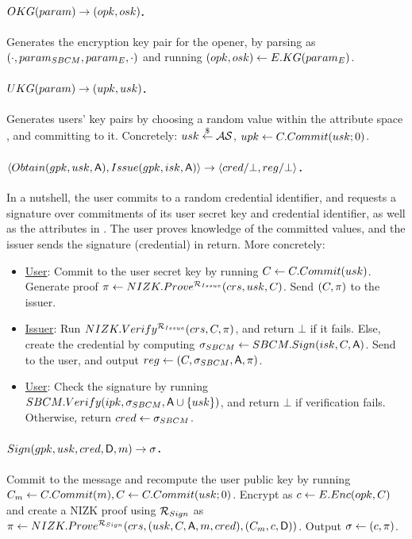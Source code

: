 \paragraph{$OKG(param) \rightarrow (opk,osk)$.} %
Generates the encryption key pair for the opener, by parsing \parm as
$(\cdot,param_{SBCM},param_{E},\cdot)$ and running $(opk,osk) \gets
E.KG(param_{E})$.

\paragraph{$UKG(param) \rightarrow (upk,usk)$.} %
Generates users' key pairs by choosing a random value within the attribute space
\AttrSpace, and committing to it. Concretely: $usk \stackrel{\$}{\gets} \mathcal{AS}$, $upk
\gets C.Commit(usk; 0)$.

\paragraph{$\langle Obtain(gpk,usk,\mathsf{A}),Issue(gpk,isk,\mathsf{A}) \rangle
  \rightarrow \langle cred/\bot,reg/\bot \rangle$.} %
In a nutshell, the user commits to a random credential identifier, and requests
a signature over commitments of its user secret key and credential identifier,
as well as the attributes in \Attrs. The user proves knowledge of the committed
values, and the issuer sends the signature (credential) in return. More
concretely:

\begin{itemize}
\item \underline{User}: Commit to the user secret key by running $C \gets
  C.Commit(usk)$. Generate proof $\pi \gets
  NIZK.Prove^{\mathcal{R}_{Issue}}(crs,usk,C)$. Send $(C,
  \pi)$ to the issuer.
\item \underline{Issuer}: Run $NIZK.Verify^{\mathcal{R}_{Issue}}(crs,
  C,\pi)$, and return $\bot$ if it fails. Else, create the credential
  by computing $\sigma_{SBCM} \gets SBCM.Sign(isk,C,\mathsf{A})$. Send \SBCMsig to the
  user, and output $reg \gets (C,\sigma_{SBCM},\mathsf{A},\pi)$.
\item \underline{User}: Check the signature by running $SBCM.Verify(ipk,
  \sigma_{SBCM},\mathsf{A} \cup \lbrace usk \rbrace)$, and return $\bot$ if
  verification fails. Otherwise, return $cred \gets \sigma_{SBCM}$.
\end{itemize}

\paragraph{$Sign(gpk,usk,cred,\mathsf{D},m) \rightarrow \sigma$.} %
Commit to the message and recompute the user public key by running
$C_{m} \gets C.Commit(m), C \gets C.Commit(usk; 0)$.
Encrypt \Ccom as $c \gets E.Enc(opk,C)$ and create a NIZK proof using
$\mathcal{R}_{Sign}$ as $\pi \gets NIZK.Prove^{\mathcal{R}_{Sign}}
(crs,(usk,C,\mathsf{A},m,cred),
(C_{m},c,\mathsf{D}))$. Output $\sigma \gets (c,\pi)$.

